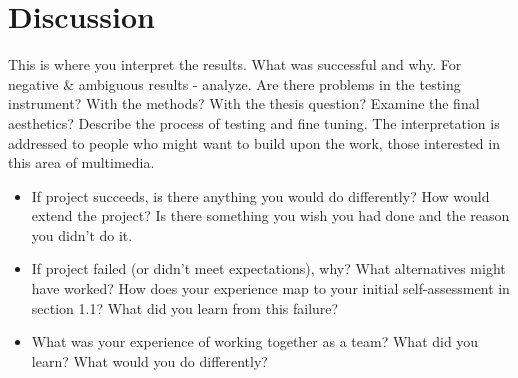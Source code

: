 \chapter{Discussion}
This is where you interpret the results. What was successful and why. For negative \& ambiguous results - analyze. Are there problems in the testing instrument? With the methods? With the thesis question? Examine the final aesthetics? Describe the process of testing and fine tuning. The interpretation is addressed to people who might want to build upon the work, those interested in this area of multimedia.
\begin {itemize}
\item If project succeeds, is there anything you would do differently? How would extend the project? Is there something you wish you had done and the reason you didn't do it.
\item If project failed (or didn't meet expectations), why? What alternatives might have worked? How does your experience map to your initial self-assessment in section 1.1? What did you learn from this failure?
\item What was your experience of working together as a team? What did you learn? What would you do differently?
\end {itemize}
